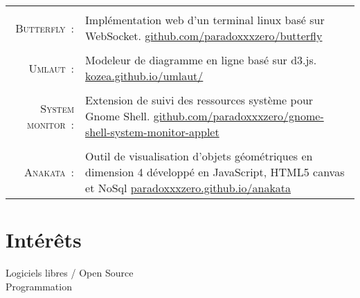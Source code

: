 \documentclass[a4paper,10pt]{article}
\begin{document}
\begin{tabular}{r|p{11cm}}
  \multicolumn{2}{c}{} \\
  \textsc{Butterfly :} &  Implémentation web d'un terminal linux basé sur WebSocket. \href{https://github.com/paradoxxxzero/butterfly}{github.com/paradoxxxzero/butterfly}\\

  \multicolumn{2}{c}{} \\
  \textsc{Umlaut :} & Modeleur de diagramme en ligne basé sur d3.js. \href{http://kozea.github.io/umlaut/}{kozea.github.io/umlaut/} \\

  \multicolumn{2}{c}{} \\
  \textsc{System monitor :} & Extension de suivi des ressources système pour Gnome Shell. \href{https://github.com/paradoxxxzero/gnome-shell-system-monitor-applet}{github.com/paradoxxxzero/gnome-shell-system-monitor-applet} \\

  \multicolumn{2}{c}{} \\
  \textsc{Anakata :} & Outil de visualisation d’objets géométriques en dimension 4 développé en JavaScript, HTML5 canvas et NoSql \href{http://paradoxxxzero.github.io/anakata/}{paradoxxxzero.github.io/anakata} \\

\end{tabular}

\section{Intérêts}
Logiciels libres / Open Source \\
Programmation
\end{document}
